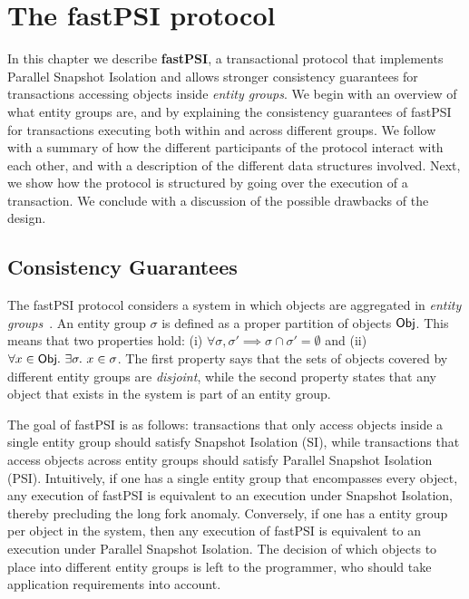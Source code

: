 \cleardoublepage
\chapter{The fastPSI protocol}
\label{chapter:protocol}

In this chapter we describe \textbf{fastPSI}, a transactional protocol that implements Parallel Snapshot Isolation and allows stronger consistency guarantees for transactions accessing objects inside \emph{entity groups}. We begin with an overview of what entity groups are, and by explaining the consistency guarantees of fastPSI for transactions executing both within and across different groups. We follow with a summary of how the different participants of the protocol interact with each other, and with a description of the different data structures involved. Next, we show how the protocol is structured by going over the execution of a transaction. We conclude with a discussion of the possible drawbacks of the design.

\section{Consistency Guarantees}

The fastPSI protocol considers a system in which objects are aggregated in \emph{entity groups}~\citep{baker_megastore}. An entity group $\sigma$ is defined as a proper partition of objects ${\sf Obj}$. This means that two properties hold: (i) $\forall \sigma, \sigma' \implies \sigma \cap \sigma' = \emptyset$ and (ii) $\forall x \in {\sf Obj} .\ \exists \sigma .\ x \in \sigma$. The first property says that the sets of objects covered by different entity groups are \emph{disjoint}, while the second property states that any object that exists in the system is part of an entity group.

The goal of fastPSI is as follows: transactions that only access objects inside a single entity group should satisfy Snapshot Isolation (SI), while transactions that access objects across entity groups should satisfy Parallel Snapshot Isolation (PSI). Intuitively, if one has a single entity group that encompasses every object, any execution of fastPSI is equivalent to an execution under Snapshot Isolation, thereby precluding the long fork anomaly. Conversely, if one has a entity group per object in the system, then any execution of fastPSI is equivalent to an execution under Parallel Snapshot Isolation. The decision of which objects to place into different entity groups is left to the programmer, who should take application requirements into account.

